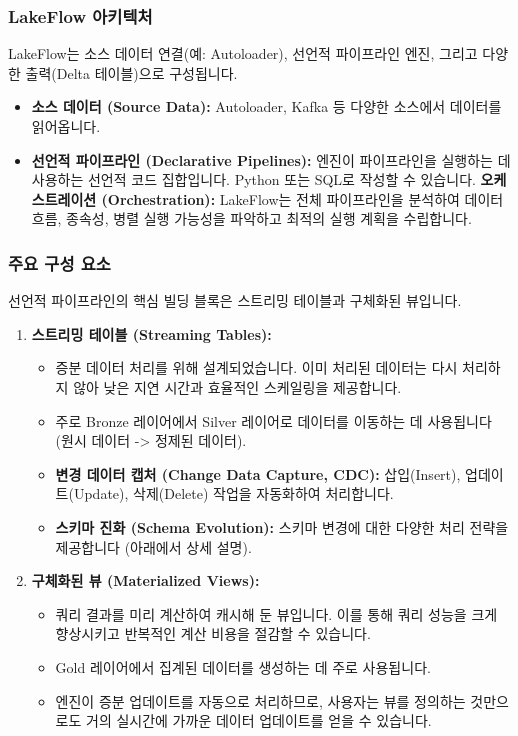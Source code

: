 \documentclass[11pt,a4paper]{article}
\theoremstyle{definition}
\begin{document}
\begin{enumerate}
\subsubsection{LakeFlow 아키텍처}
LakeFlow는 소스 데이터 연결(예: Autoloader), 선언적 파이프라인 엔진, 그리고 다양한 출력(Delta 테이블)으로 구성됩니다.

\begin{itemize}
    \item \textbf{소스 데이터 (Source Data):} Autoloader, Kafka 등 다양한 소스에서 데이터를 읽어옵니다.
    \item \textbf{선언적 파이프라인 (Declarative Pipelines):} 엔진이 파이프라인을 실행하는 데 사용하는 선언적 코드 집합입니다. Python 또는 SQL로 작성할 수 있습니다.
    \textbf{오케스트레이션 (Orchestration):} LakeFlow는 전체 파이프라인을 분석하여 데이터 흐름, 종속성, 병렬 실행 가능성을 파악하고 최적의 실행 계획을 수립합니다.
\end{itemize}

\subsubsection{주요 구성 요소}
선언적 파이프라인의 핵심 빌딩 블록은 스트리밍 테이블과 구체화된 뷰입니다.

\begin{enumerate}
    \item \textbf{스트리밍 테이블 (Streaming Tables):}
    \begin{itemize}
        \item 증분 데이터 처리를 위해 설계되었습니다. 이미 처리된 데이터는 다시 처리하지 않아 낮은 지연 시간과 효율적인 스케일링을 제공합니다.
        \item 주로 Bronze 레이어에서 Silver 레이어로 데이터를 이동하는 데 사용됩니다 (원시 데이터 -> 정제된 데이터).
        \item \textbf{변경 데이터 캡처 (Change Data Capture, CDC):} 삽입(Insert), 업데이트(Update), 삭제(Delete) 작업을 자동화하여 처리합니다.
        \item \textbf{스키마 진화 (Schema Evolution):} 스키마 변경에 대한 다양한 처리 전략을 제공합니다 (아래에서 상세 설명).
    \end{itemize}

    \item \textbf{구체화된 뷰 (Materialized Views):}
    \begin{itemize}
        \item 쿼리 결과를 미리 계산하여 캐시해 둔 뷰입니다. 이를 통해 쿼리 성능을 크게 향상시키고 반복적인 계산 비용을 절감할 수 있습니다.
        \item Gold 레이어에서 집계된 데이터를 생성하는 데 주로 사용됩니다.
        \item 엔진이 증분 업데이트를 자동으로 처리하므로, 사용자는 뷰를 정의하는 것만으로도 거의 실시간에 가까운 데이터 업데이트를 얻을 수 있습니다.
    \end{itemize}
\end{enumerate}


\end{enumerate}
\end{document}
